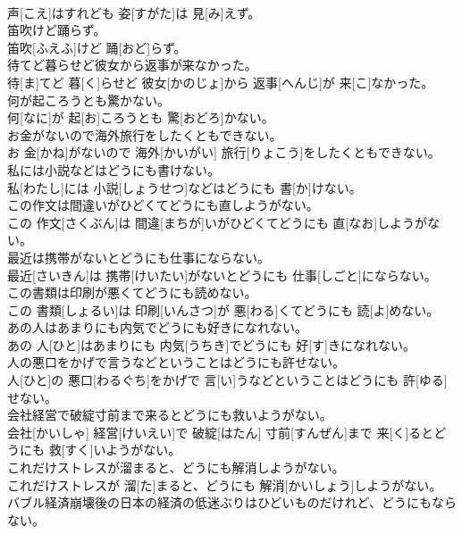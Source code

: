 \documentclass[8pt]{extreport}
\begin{document}
\begin{CJK}{UTF8}{min}
\\	声[こえ]はすれども 姿[すがた]は 見[み]えず。
\\	笛吹けど踊らず。	
\\	笛吹[ふえふ]けど 踊[おど]らず。
\\	待てど暮らせど彼女から返事が来なかった。	
\\	待[ま]てど 暮[く]らせど 彼女[かのじょ]から 返事[へんじ]が 来[こ]なかった。
\\	何が起ころうとも驚かない。	
\\	何[なに]が 起[お]ころうとも 驚[おどろ]かない。
\\	お金がないので海外旅行をしたくともできない。	
\\	お 金[かね]がないので 海外[かいがい] 旅行[りょこう]をしたくともできない。
\\	私には小説などはどうにも書けない。	
\\	私[わたし]には 小説[しょうせつ]などはどうにも 書[か]けない。
\\	この作文は間違いがひどくてどうにも直しようがない。	
\\	この 作文[さくぶん]は 間違[まちが]いがひどくてどうにも 直[なお]しようがない。
\\	最近は携帯がないとどうにも仕事にならない。	
\\	最近[さいきん]は 携帯[けいたい]がないとどうにも 仕事[しごと]にならない。
\\	この書類は印刷が悪くてどうにも読めない。	
\\	この 書類[しょるい]は 印刷[いんさつ]が 悪[わる]くてどうにも 読[よ]めない。
\\	あの人はあまりにも内気でどうにも好きになれない。	
\\	あの 人[ひと]はあまりにも 内気[うちき]でどうにも 好[す]きになれない。
\\	人の悪口をかげで言うなどということはどうにも許せない。	
\\	人[ひと]の 悪口[わるぐち]をかげで 言[い]うなどということはどうにも 許[ゆる]せない。
\\	会社経営で破綻寸前まで来るとどうにも救いようがない。	
\\	会社[かいしゃ] 経営[けいえい]で 破綻[はたん] 寸前[すんぜん]まで 来[く]るとどうにも 救[すく]いようがない。
\\	これだけストレスが溜まると、どうにも解消しようがない。	
\\	これだけストレスが 溜[た]まると、どうにも 解消[かいしょう]しようがない。
\\	バブル経済崩壊後の日本の経済の低迷ぶりはひどいものだけれど、どうにもならない。	

\end{CJK}
\end{document}
